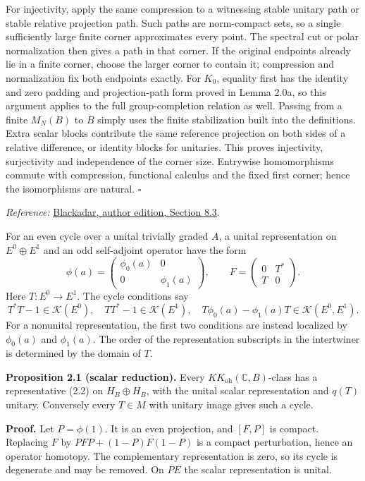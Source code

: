 \documentclass[
  11pt,
]{article}
\begin{document}
For injectivity, apply the same compression to a witnessing stable
unitary path or stable relative projection path. Such paths are
norm-compact sets, so a single sufficiently large finite corner
approximates every point. The spectral cut or polar normalization then
gives a path in that corner. If the original endpoints already lie in a
finite corner, choose the larger corner to contain it; compression and
normalization fix both endpoints exactly. For \(K_0\), equality first
has the identity and zero padding and projection-path form proved in
Lemma 2.0a, so this argument applies to the full group-completion
relation as well. Passing from a finite \(M_N(B)\) to \(B\) simply uses
the finite stabilization built into the definitions. Extra scalar blocks
contribute the same reference projection on both sides of a relative
difference, or identity blocks for unitaries. This proves injectivity,
surjectivity and independence of the corner size. Entrywise
homomorphisms commute with compression, functional calculus and the
fixed first corner; hence the isomorphisms are natural. \(\square\)

\emph{Reference:}
\href{https://www.bruceblackadar.com/Mathematics/book6.pdf}{Blackadar,
author edition, Section 8.3}.

For an even cycle over a unital trivially graded \(A\), a unital
representation on \(E^0\oplus E^1\) and an odd self-adjoint operator
have the form \[
\phi(a)=
\begin{pmatrix}\phi_0(a)&0\\0&\phi_1(a)\end{pmatrix},
\qquad
F=\begin{pmatrix}0&T^*\\T&0\end{pmatrix}.
\tag{2.2}
\] Here \(T:E^0\to E^1\). The cycle conditions say \[
T^*T-1\in\mathcal K(E^0),\quad
TT^*-1\in\mathcal K(E^1),\quad
T\phi_0(a)-\phi_1(a)T\in\mathcal K(E^0,E^1).
\tag{2.3}
\] For a nonunital representation, the first two conditions are instead
localized by \(\phi_0(a)\) and \(\phi_1(a)\). The order of the
representation subscripts in the intertwiner is determined by the domain
of \(T\).

\textbf{Proposition 2.1 (scalar reduction).} Every
\(KK_{\mathrm{oh}}(\mathbb C,B)\)-class has a representative (2.2) on
\(H_B\oplus H_B\), with the unital scalar representation and \(q(T)\)
unitary. Conversely every \(T\in M\) with unitary image gives such a
cycle.

\textbf{Proof.} Let \(P=\phi(1)\). It is an even projection, and
\([F,P]\) is compact. Replacing \(F\) by \(PFP+(1-P)F(1-P)\) is a
compact perturbation, hence an operator homotopy. The complementary
representation is zero, so its cycle is degenerate and may be removed.
On \(PE\) the scalar representation is unital.
\end{document}

